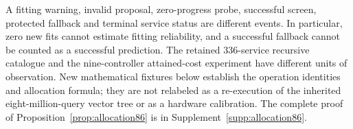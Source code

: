 A fitting warning, invalid proposal, zero-progress probe, successful screen, protected fallback and terminal service status are different events. In particular, zero new fits cannot estimate fitting reliability, and a successful fallback cannot be counted as a successful prediction. The retained 336-service recursive catalogue and the nine-controller attained-cost experiment have different units of observation. New mathematical fixtures below establish the operation identities and allocation formula; they are not relabeled as a re-execution of the inherited eight-million-query vector tree or as a hardware calibration. The complete proof of Proposition~\ref{prop:allocation86} is in Supplement~\ref{supp:allocation86}.

